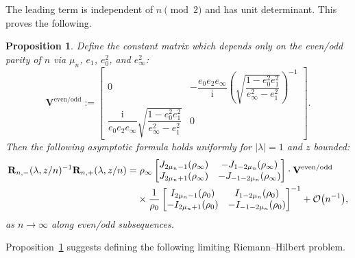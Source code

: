 \documentclass[11pt]{article}
\numberwithin{equation}{section}
\numberwithin{equation}{section}
\newtheorem{prop}[Theorem]{Proposition}
 { \theoremstyle{definition}
\newtheorem{Definition}[Theorem]{Definition}
\newtheorem{Note}[Theorem]{Note}
\newtheorem{Example}[Theorem]{Example}
\newtheorem{Remark}[Theorem]{Remark} }
\newcommand{\ii}{\mathrm{i}}
\begin{document}
The leading term is independent of $n\pmod{2}$ and has unit determinant. This proves the following.
\begin{prop}
Define the constant matrix which depends only on the even/odd parity of $n$ via $\mu_n$, $e_1$, $e_0^2$, and $e_\infty^2$:
\begin{equation}
 \mathbf{V}^\mathrm{even/odd}:=\begin{bmatrix} 0 & -\dfrac{e_0 e_2 e_\infty}{\ii} \left(\sqrt{\dfrac{1 - e_0^2 e_1^2}{e_\infty^2-e_1^2 } }\right)^{-1} \\
 \dfrac{ \ii }{e_0 e_2 e_\infty} \sqrt{\dfrac{1 - e_0^2 e_1^2}{e_\infty^2-e_1^2 }} & 0
\end{bmatrix}.
 \label{eq:Vm-even}
\end{equation}
Then the following asymptotic formula holds uniformly for $|\lambda|=1$ and $z$ bounded:
\begin{align*}
& \mathbf{R}_{n,-}(\lambda,z/n)^{-1}\mathbf{R}_{n,+}(\lambda,z/n)= {\rho_\infty}\begin{bmatrix}J_{2\mu_n - 1}(\rho_\infty) & -J_{1- 2\mu_n}(\rho_\infty)\\
 J_{2\mu_n +1}(\rho_\infty) & -J_{-1-2\mu_n}(\rho_\infty)\end{bmatrix}\cdot\mathbf{V}^\mathrm{even/odd}\\
&\hphantom{\mathbf{R}_{n,-}(\lambda,z/n)^{-1}\mathbf{R}_{n,+}(\lambda,z/n)=}{}
\times
 \dfrac{1}{\rho_0}\begin{bmatrix}I_{2\mu_n - 1}(\rho_0) & I_{1- 2\mu_n}(\rho_0)\\
 -I_{2\mu_n +1}(\rho_0) & -I_{-1-2\mu_n}(\rho_0)\end{bmatrix}^{-1}+\mathcal{O}\big(n^{-1}\big),
\end{align*}
as $n\to\infty$ along even/odd subsequences.
\label{prop:limiting-jump}
\end{prop}
Proposition~\ref{prop:limiting-jump} suggests defining the following limiting Riemann--Hilbert problem.
\end{document}

